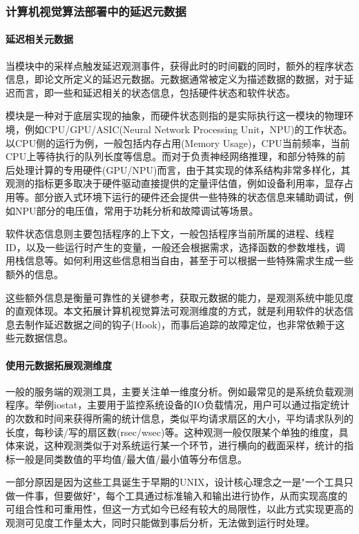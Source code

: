 \documentclass[master]{shtthesis}
\begin{document}
\subsubsection{计算机视觉算法部署中的延迟元数据}\label{计算机视觉算法部署中的延迟元数据}
\paragraph{延迟相关元数据}
当模块中的采样点触发延迟观测事件，获得此时的时间戳的同时，额外的程序状态信息，即论文所定义的延迟元数据。元数据通常被定义为描述数据的数据，对于延迟而言，即一些和延迟相关的状态信息，包括硬件状态和软件状态。

模块是一种对于底层实现的抽象，而硬件状态则指的是实际执行这一模块的物理环境，例如CPU/GPU/ASIC(Neural Network Processing Unit，NPU)的工作状态。以CPU侧的运行为例，一般包括内存占用(Memory Usage)，CPU当前频率，当前CPU上等待执行的队列长度等信息。而对于负责神经网络推理，和部分特殊的前后处理计算的专用硬件(GPU/NPU)而言，由于其实现的体系结构非常多样化，其观测的指标更多取决于硬件驱动直接提供的定量评估值，例如设备利用率，显存占用等。部分嵌入式环境下运行的硬件还会提供一些特殊的状态信息来辅助调试，例如NPU部分的电压值，常用于功耗分析和故障调试等场景。

软件状态信息则主要包括程序的上下文，一般包括程序当前所属的进程、线程ID，以及一些运行时产生的变量，一般还会根据需求，选择函数的参数堆栈，调用栈信息等。如何利用这些信息相当自由，甚至于可以根据一些特殊需求生成一些额外的信息。

这些额外信息是衡量可靠性的关键参考，获取元数据的能力，是观测系统中能见度的直观体现。本文拓展计算机视觉算法可观测维度的方式，就是利用软件的状态信息去制作延迟数据之间的钩子(Hook)，而事后追踪的故障定位，也非常依赖于这些元数据信息。
\paragraph{使用元数据拓展观测维度}
一般的服务端的观测工具，主要关注单一维度分析。例如最常见的是系统负载观测程序。举例iostat\cite{chandran2014monitoring}，主要用于监控系统设备的IO负载情况，用户可以通过指定统计的次数和时间来获得所需的统计信息，类似平均请求扇区的大小，平均请求队列的长度，每秒读/写的扇区数(rsec/wsec)等。这种观测一般仅限某个单独的维度，具体来说，这种观测类似于对系统运行某一个环节，进行横向的截面采样，统计的指标一般是同类数值的平均值/最大值/最小值等分布信息。

一部分原因是因为这些工具诞生于早期的UNIX，设计核心理念之一是"一个工具只做一件事，但要做好"，每个工具通过标准输入和输出进行协作，从而实现高度的可组合性和可重用性，但这一方式如今已经有较大的局限性，以此方式实现更高的观测可见度工作量太大，同时只能做到事后分析，无法做到运行时处理。
\end{document}
